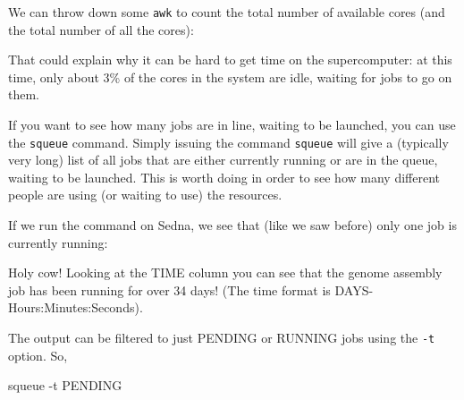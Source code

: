 \documentclass[]{krantz}
\makeatletter
\newenvironment{Shaded}{\begin{snugshade}}{\end{snugshade}}
\newcommand{\ExtensionTok}[1]{#1}
\newcommand{\FunctionTok}[1]{\textcolor[rgb]{0,0,0}{#1}}
\newcommand{\KeywordTok}[1]{\textcolor[rgb]{0.27,0.27,0.27}{\textbf{#1}}}
\newcommand{\NormalTok}[1]{#1}
\newcommand{\StringTok}[1]{\textcolor[rgb]{0.5,0.5,0.5}{#1}}
\newenvironment{kframe}{%
\medskip{}
\setlength{\fboxsep}{.8em}
 \def\at@end@of@kframe{}%
 \ifinner\ifhmode%
  \def\at@end@of@kframe{\end{minipage}}%
  \begin{minipage}{\columnwidth}%
 \fi\fi%
 \def\FrameCommand##1{\hskip\@totalleftmargin \hskip-\fboxsep
 \colorbox{shadecolor}{##1}\hskip-\fboxsep
     \hskip-\linewidth \hskip-\@totalleftmargin \hskip\columnwidth}%
 \MakeFramed {\advance\hsize-\width
   \@totalleftmargin\z@ \linewidth\hsize
   \@setminipage}}%
 {\par\unskip\endMakeFramed%
 \at@end@of@kframe}
\renewenvironment{Shaded}{\begin{kframe}}{\end{kframe}}
\makeatother
\begin{document}
We can throw down some \texttt{awk} to count the total number of available cores
(and the total number of all the cores):

\begin{Shaded}
\end{Shaded}

That could explain why it can be hard to get time on the supercomputer: at this time, only about 3\% of the cores in the system
are idle, waiting for jobs to go on them.

If you want to see how many jobs are in line, waiting to be launched, you can use the
\texttt{squeue} command. Simply issuing the command \texttt{squeue} will give a (typically very long)
list of all jobs that are either currently running or are in the queue,
waiting to be launched. This is worth doing in order to see how many
different people are using (or waiting to use) the resources.

If we run the command on Sedna, we see that (like we saw before)
only one job is currently running:

\begin{Shaded}
\end{Shaded}

Holy cow! Looking at the TIME column you can see that the genome assembly job
has been running for over 34 days! (The time format is DAYS-Hours:Minutes:Seconds).

The output can be filtered to just PENDING
or RUNNING jobs using the \texttt{-t} option. So,

\begin{Shaded}
\begin{Highlighting}[]
\ExtensionTok{squeue}\NormalTok{ -t PENDING}
\end{Highlighting}
\end{Shaded}
\end{document}
